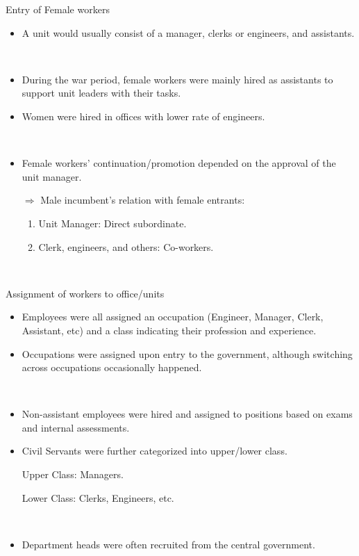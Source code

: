 \begin{frame}{Entry of Female workers}
    \begin{itemize}
        \item A unit would usually consist of a manager, clerks or engineers, and assistants.

        \

        \item During the war period, female workers were mainly hired as assistants to support unit leaders with their tasks.    
        \item Women were hired in offices with lower rate of engineers.
        
        \

        \item Female workers' continuation/promotion depended on the approval of the unit manager.

        $\Rightarrow$ Male incumbent's relation with female entrants:
        \begin{enumerate}
            \item Unit Manager: Direct subordinate.
            \item Clerk, engineers, and others: Co-workers.
        \end{enumerate}

        \


    \end{itemize}
\end{frame}

\begin{frame}{Assignment of workers to office/units}
\begin{itemize}
    \item Employees were all assigned an occupation (Engineer, Manager, Clerk, Assistant, etc) and a class indicating their profession and experience.
        
    \item Occupations were assigned upon entry to the government, although switching across occupations occasionally happened.

    \

    \item Non-assistant employees were hired and assigned to positions based on exams and internal assessments.

    \item Civil Servants were further categorized into upper/lower class.

    Upper Class: Managers.
    
    Lower Class: Clerks, Engineers, etc.

    \

    \item Department heads were often recruited from the central government. 
\end{itemize}
\end{frame}

